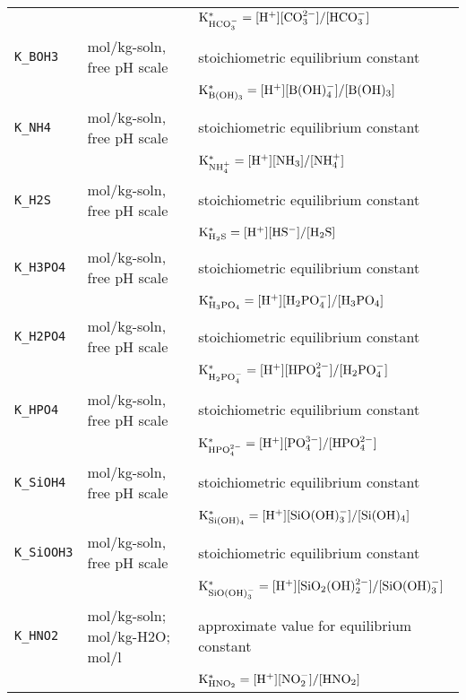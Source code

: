 \documentclass[article,nojss]{jss}
\begin{document}
\begin{footnotesize}
\begin{longtable}{l|l|p{7cm}}
            &                                 & $\rm K^*_{HCO_3^{-}} = [H^+][CO_3^{2-}] / [HCO_3^{-}]$\\
\texttt{K\_BOH3}     &mol/kg-soln,       free pH scale & stoichiometric equilibrium constant\\
            &                                 & $\rm K^*_{B(OH)_3} = [H^+][B(OH)_4^-] / [B(OH)_3]$\\          
\texttt{K\_NH4}      &mol/kg-soln,       free pH scale & stoichiometric equilibrium constant\\
            &                                 & $\rm K^*_{NH_4^+} = [H^+][NH_3] / [NH_4^+]$\\
\texttt{K\_H2S}      &mol/kg-soln,       free pH scale & stoichiometric equilibrium constant \\
            &                                 & $\rm K^*_{H_2S} = [H^+][HS^-] / [H_2S]$\\
\texttt{K\_H3PO4}    &mol/kg-soln,       free pH scale & stoichiometric equilibrium constant\\
            &                                 & $\rm K^*_{H_3PO_4} = [H^+][H_2PO_4^-] / [H_3PO_4]$\\         
\texttt{K\_H2PO4}    &mol/kg-soln,       free pH scale & stoichiometric equilibrium constant\\
            &                                 & $\rm K^*_{H_2PO_4^-} = [H^+][HPO_4^{2-}] / [H_2PO_4^-]$\\
\texttt{K\_HPO4}     &mol/kg-soln,       free pH scale & stoichiometric equilibrium constant\\
            &                                 & $\rm K^*_{HPO_4^{2-}} = [H^+][PO_4^{3-}] / [HPO_4^{2-}]$\\
\texttt{K\_SiOH4}    &mol/kg-soln,       free pH scale & stoichiometric equilibrium constant\\
            &                                 & $\rm K^*_{Si(OH)_4} = [H^+][SiO(OH)_3^-] / [Si(OH)_4]$\\         
\texttt{K\_SiOOH3}   &mol/kg-soln,       free pH scale & stoichiometric equilibrium constant\\
            &                                 & $\rm K^*_{SiO(OH)_3^-} = [H^+][SiO_2(OH)_2^{2-}] / [SiO(OH)_3^-]$\\         
\texttt{K\_HNO2}     &mol/kg-soln; mol/kg-H2O; mol/l   & approximate value for equilibrium constant \\
            &                                 & $\rm K^*_{HNO_2} = [H^+][NO_2^-] / [HNO_2]$\\         

\end{longtable}
\end{footnotesize}
\end{document}
